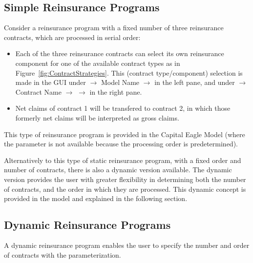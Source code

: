 \subsection{Simple Reinsurance Programs}
\label{sec:SimpleRePro}

Consider a reinsurance program with a fixed number of three reinsurance contracts, which are processed in serial order:
\begin{itemize}
	\item Each of the three reinsurance contracts can select its own reinsurance component for one of the available contract types as in Figure~\ref{fig:ContractStrategies}. This  (contract type/component) selection is made in the GUI under  $\rightarrow$ Model Name $\rightarrow$ in the left pane, and under  $\rightarrow$ Contract Name $\rightarrow$  $\rightarrow$  in the right pane.
	\item Net claims of contract 1 will be transfered to contract 2, in which those formerly net claims will be interpreted as gross claims.
\end{itemize}

This type of reinsurance program is provided in the Capital Eagle Model (where the parameter  is not available because the processing order is predetermined).

Alternatively to this type of static reinsurance program, with a fixed order and number of contracts, there is also a dynamic version available. The dynamic version provides the user with greater flexibility in determining both the number of contracts, and the order in which they are processed. This dynamic concept is provided in the model  and explained in the following section.

\subsection{Dynamic Reinsurance Programs}
\label{sec:DynamicRePro}

A dynamic reinsurance program enables the user to specify the number and order of contracts with the parameterization.


